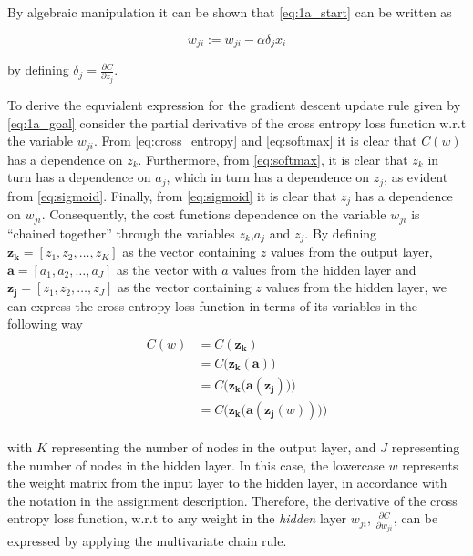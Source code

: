 \documentclass{article}
\begin{document}
By algebraic manipulation it can be shown that \eqref{eq:1a_start} can be written as

\begin{equation}
    w_{j i}:=w_{j i}-\alpha \delta_{j} x_{i}
    \label{eq:1a_goal}
\end{equation}

by defining $\delta_{j}=\frac{\partial C}{\partial z_{j}}$.

To derive the equvialent expression for the gradient descent update rule given by \eqref{eq:1a_goal} consider the partial derivative of the cross entropy loss function w.r.t the variable $w_{ji}$. From \eqref{eq:cross_entropy} and \eqref{eq:softmax} it is clear that $C(w)$ has a dependence on $z_k$. Furthermore, from \eqref{eq:softmax}, it is clear that $z_k$ in turn has a dependence on $a_j$, which in turn has a dependence on $z_j$, as evident from \eqref{eq:sigmoid}. Finally, from \eqref{eq:sigmoid} it is clear that $z_j$ has a dependence on $w_{ji}$. Consequently, the cost functions dependence on the variable $w_{ji}$ is ``chained together'' through the variables $z_k$,$a_j$ and $z_j$. By defining $\boldsymbol{z_{k}} = [z_1,z_2,\dots,z_K]$ as the vector containing $z$ values from the output layer, $\boldsymbol{a} = [a_1,a_2,\dots,a_J]$ as the vector with $a$ values from the hidden layer and $\boldsymbol{z_j} = [z_1,z_2,\dots,z_J]$ as the vector containing $z$ values from the hidden layer, we can express the cross entropy loss function in terms of its variables in the following way
\begin{align}
\begin{split}
    C(w) &= C(\boldsymbol{z_k}) \\ 
    &= C\big(\boldsymbol{z_k}(\boldsymbol{a})\big) \\
    &= C\bigg(\boldsymbol{z_k}\big(\boldsymbol{a}(\boldsymbol{z_j})\big)\bigg) \\
    &= C\bigg(\boldsymbol{z_k}\big(\boldsymbol{a}(\boldsymbol{z_j}(w))\big)\bigg)
    \label{eq:cost_var_def}
\end{split}
\end{align}

with $K$ representing the number of nodes in the output layer, and $J$ representing the number of nodes in the hidden layer. In this case, the lowercase $w$ represents the weight matrix from the input layer to the hidden layer, in accordance with the notation in the assignment description. Therefore, the derivative of the cross entropy loss function, w.r.t to any weight in the \textit{hidden} layer $w_{ji}$, $\frac{\partial C}{\partial w_{ji}}$, can be expressed by applying the multivariate chain rule.
\end{document}
